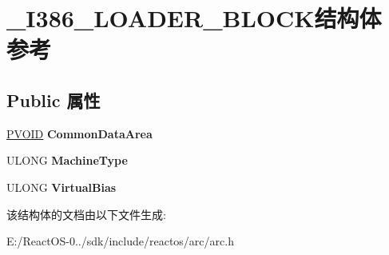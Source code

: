 \hypertarget{struct___i386___l_o_a_d_e_r___b_l_o_c_k}{}\section{\+\_\+\+I386\+\_\+\+L\+O\+A\+D\+E\+R\+\_\+\+B\+L\+O\+C\+K结构体 参考}
\label{struct___i386___l_o_a_d_e_r___b_l_o_c_k}
\subsection*{Public 属性}
\begin{DoxyCompactItemize}
\item 
\mbox{\label{struct___i386___l_o_a_d_e_r___b_l_o_c_k_a579d521e706905cf83ce608d7cefd2e2}} 
\hyperlink{interfacevoid}{P\+V\+O\+ID} {\bfseries Common\+Data\+Area}
\item 
\mbox{\label{struct___i386___l_o_a_d_e_r___b_l_o_c_k_a00199ed709ebe59479752a7eac703d26}} 
U\+L\+O\+NG {\bfseries Machine\+Type}
\item 
\mbox{\label{struct___i386___l_o_a_d_e_r___b_l_o_c_k_a5945d258b5c6fe058abcf66b380ee15d}} 
U\+L\+O\+NG {\bfseries Virtual\+Bias}
\end{DoxyCompactItemize}


该结构体的文档由以下文件生成\+:\begin{DoxyCompactItemize}
\item 
E\+:/\+React\+O\+S-\/0../sdk/include/reactos/arc/arc.\+h\end{DoxyCompactItemize}
